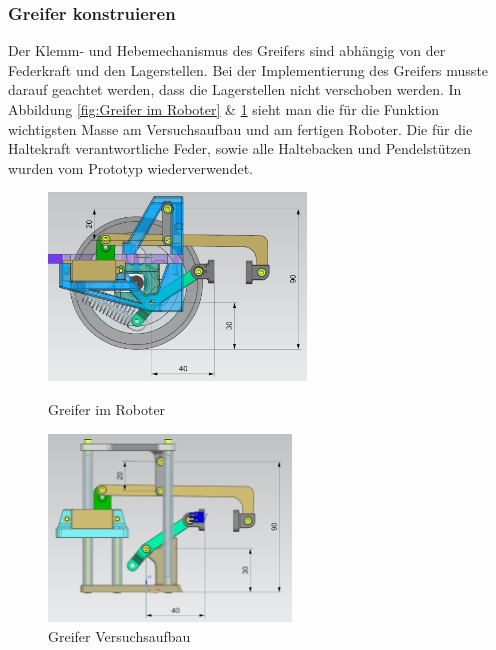 \subsubsection{Greifer konstruieren}
\label{Greifer konstruieren}

Der Klemm- und Hebemechanismus des Greifers sind abhängig von der Federkraft und den Lagerstellen. Bei der Implementierung des Greifers musste darauf geachtet werden, dass die Lagerstellen nicht verschoben werden. In Abbildung \ref{fig:Greifer im Roboter} \& \ref{fig:Greifer Versuchsaufbau} sieht man die für die Funktion wichtigsten Masse am Versuchsaufbau und am fertigen Roboter. Die für die Haltekraft verantwortliche Feder, sowie alle Haltebacken und Pendelstützen wurden vom Prototyp wiederverwendet. 

\begin{figure}[H]
  \centering
  \begin{minipage}[b]{0.45\textwidth}
    \centering
    \includegraphics[height=5cm]{assets/MT/Greifer Montiert.png}
    \caption{Greifer im Roboter}
    \label{fig:Greifer im Roboter}
  \end{minipage}
  \hfill
  \begin{minipage}[b]{0.45\textwidth}
    \centering
    \includegraphics[height=5cm]{assets/MT/Greifer Prototyp.png}
    \caption{Greifer Versuchsaufbau}
    \label{fig:Greifer Versuchsaufbau}
  \end{minipage}
\end{figure}

\newpage

